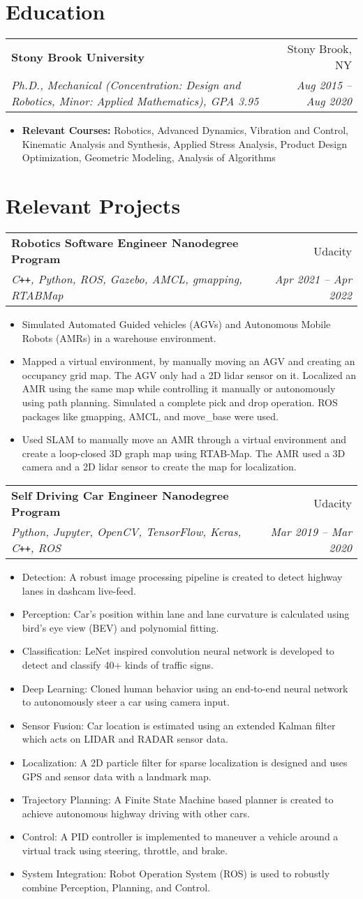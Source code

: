 \documentclass[letterpaper,10pt]{article}
\makeatletter
\newcommand{\resumeHeading}[4]{
  \vspace{-1pt}
    \begin{tabular*}{0.97\textwidth}{l@{\extracolsep{\fill}}r}
      \textbf{#1} & #2 \vspace{-2pt}\\ \vspace{1pt}
      \textit{\small#3} & \textit{\small #4} \\
    \end{tabular*}
}
\newcommand{\resumeSection}[1]{
\vspace{-12pt}
\section{\textbf{#1}}
}
\newcommand{\resumeItemListStart}{
\vspace{-6pt}
\begin{itemize}[leftmargin=14pt]
}
\newcommand{\resumeItemListEnd}{
\vspace{+6pt}
\end{itemize}
}
\newcommand{\resumeItem}[1]{
  \item\small{
      {#1 \vspace{-7pt}
      }
  }
}
\makeatother
\begin{document}
\resumeSection{Education}
\resumeHeading
{Stony Brook University}{Stony Brook, NY}
{Ph.D., Mechanical (Concentration: Design and Robotics, Minor: Applied Mathematics), GPA 3.95}{Aug 2015 -- Aug 2020}
\resumeItemListStart
\resumeItem{\textbf{Relevant Courses:} Robotics, Advanced Dynamics, Vibration and Control, Kinematic Analysis and Synthesis,  Applied Stress Analysis, Product Design Optimization, Geometric Modeling, Analysis of Algorithms}
\resumeItemListEnd



\resumeSection{Relevant Projects}
    
    \resumeHeading{Robotics Software Engineer Nanodegree Program}{Udacity}{C\texttt{++}, Python, ROS, Gazebo, AMCL, gmapping, RTABMap}{Apr 2021 -- Apr 2022}
    \resumeItemListStart
    \resumeItem{Simulated Automated Guided vehicles (AGVs) and Autonomous Mobile Robots (AMRs) in a warehouse environment.}
    \resumeItem{Mapped a virtual environment, by manually moving an AGV and creating an occupancy grid map. The AGV only had a 2D lidar sensor on it. Localized an AMR using the same map while controlling it manually or autonomously using path planning. Simulated a complete pick and drop operation. ROS packages like gmapping, AMCL, and move\_base were used.}
    \resumeItem{Used SLAM to manually move an AMR through a virtual environment and create a loop-closed 3D graph map using RTAB-Map. The AMR used a 3D camera and a 2D lidar sensor to create the map for localization.}
    \resumeItemListEnd
    
    \resumeHeading{Self Driving Car Engineer Nanodegree Program}{Udacity}{Python, Jupyter, OpenCV, TensorFlow, Keras, C\texttt{++}, ROS}{Mar 2019 -- Mar 2020}
    \resumeItemListStart
    \resumeItem{Detection: A robust image processing pipeline is created to detect highway lanes in dashcam live-feed.}
    \resumeItem{Perception: Car's position within lane and lane curvature is calculated using bird's eye view (BEV) and polynomial fitting.}
    \resumeItem{Classification: LeNet inspired convolution neural network is developed to detect and classify 40+ kinds of traffic signs.}
    \resumeItem{Deep Learning: Cloned human behavior using an end-to-end neural network to autonomously steer a car using camera input.}
    \resumeItem{Sensor Fusion: Car location is estimated using an extended Kalman filter which acts on LIDAR and RADAR sensor data.}
    \resumeItem{Localization: A 2D particle filter for sparse localization is designed and uses GPS and sensor data with a landmark map.}
    \resumeItem{Trajectory Planning: A Finite State Machine based planner is created to achieve autonomous highway driving with other cars.}
    \resumeItem{Control: A PID controller is implemented to maneuver a vehicle around a virtual track using steering, throttle, and brake.}
    \resumeItem{System Integration: Robot Operation System (ROS) is used to robustly combine Perception, Planning, and Control.}
    \resumeItemListEnd
\end{document}
